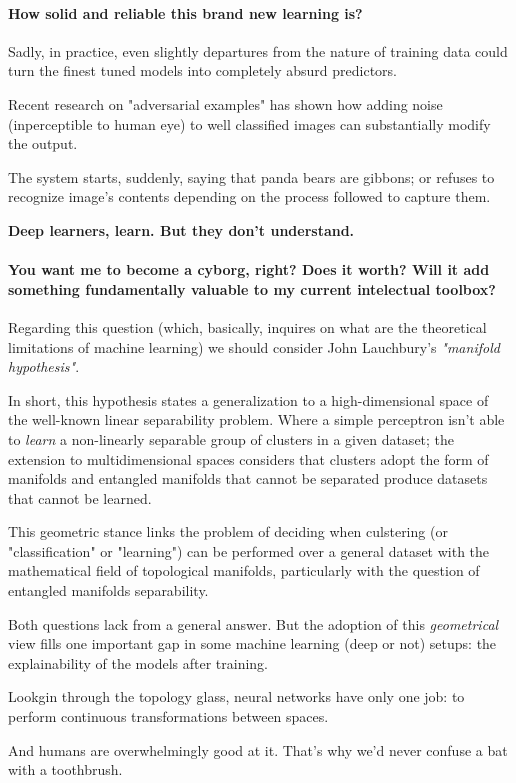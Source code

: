 \paragraph{How solid and reliable this brand new learning is?}

Sadly, in practice, even slightly departures from the nature of training data could
turn the finest tuned models into completely absurd predictors.

Recent research on "adversarial examples" has shown how adding noise (inperceptible 
to human eye) to well classified images can substantially modify the output.

The system starts, suddenly, saying that panda bears are gibbons; or refuses to 
recognize image's contents depending on the process followed to capture them.

\textbf{Deep learners, learn. But they don't understand.}

\paragraph{You want me to become a cyborg, right? Does it worth? Will it add 
something fundamentally valuable to my current intelectual toolbox?}

Regarding this question (which, basically, inquires on what are the theoretical 
limitations of machine learning) we should consider John Lauchbury's \textit{
"manifold hypothesis"}. 

In short, this hypothesis states a generalization to a high-dimensional space 
of the well-known linear separability problem. Where a simple perceptron isn't 
able to \textit{learn} a non-linearly separable group of clusters in a given 
dataset; the extension to multidimensional spaces considers that clusters adopt 
the form of manifolds and entangled manifolds that cannot be separated produce 
datasets that cannot be learned.

This geometric stance links the problem of deciding when culstering (or 
"classification" or "learning") can be performed over a general dataset with 
the mathematical field of topological manifolds, particularly with the question 
of entangled manifolds separability.

Both questions lack from a general answer. But the adoption of this \textit{
geometrical} view fills one important gap in some machine learning (deep or not) 
setups: the explainability of the models after training.

Lookgin through the topology glass, neural networks have only one job: to perform 
continuous transformations between spaces. 

And humans are overwhelmingly good at it. That's why we'd never confuse a bat 
with a toothbrush.  
